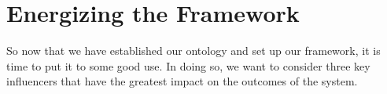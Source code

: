 \documentclass[jou,apacite]{apa6}
\begin{document}

\section{Energizing the Framework}
So now that we have established our ontology and set up our framework, it is time to put it to some good use.  In doing so, we want to consider three key influencers that have the greatest impact on the outcomes of the system.
\end{document}
